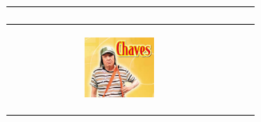 \begin{table}[h]
\begin{center}
\begin{tabular}{ |>{\centering\arraybackslash}m{5cm} | >{\centering\arraybackslash}m{5cm} | >{\centering\arraybackslash}m{5cm} | }
\begin{subfigure}[b]{5cm}
  \end{subfigure} \\
 \hline
 \begin{subfigure}[b]{5cm}
  \centering
   \includegraphics[width=5cm,height=2cm,keepaspectratio,trim=0 0 0 -5]{images/chaves/30.jpeg}
   
  \end{subfigure}
   &
   &  \\
 \hline
\end{tabular}
\label{chaves}
\end{center}
\end{table}